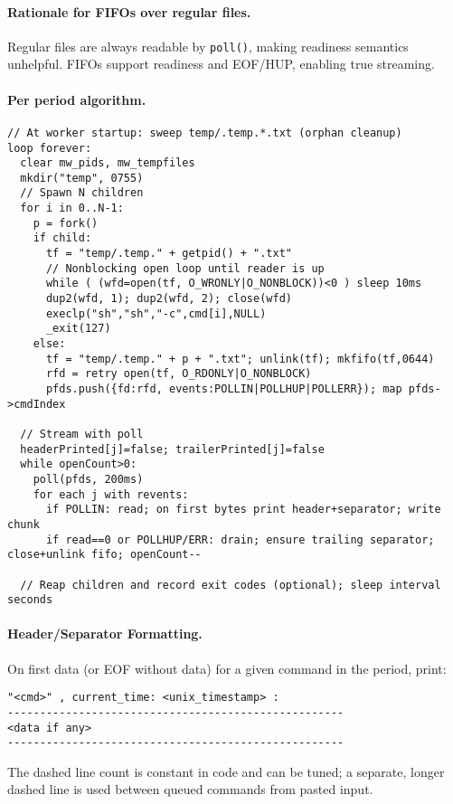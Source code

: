 \documentclass[11pt,a4paper]{article}
\begin{document}
\paragraph{Rationale for FIFOs over regular files.} Regular files are always readable by \texttt{poll()}, making readiness semantics unhelpful. FIFOs support readiness and EOF/HUP, enabling true streaming.

\paragraph{Per period algorithm.}
\begin{lstlisting}[style=code]
// At worker startup: sweep temp/.temp.*.txt (orphan cleanup)
loop forever:
  clear mw_pids, mw_tempfiles
  mkdir("temp", 0755)
  // Spawn N children
  for i in 0..N-1:
    p = fork()
    if child:
      tf = "temp/.temp." + getpid() + ".txt"
      // Nonblocking open loop until reader is up
      while ( (wfd=open(tf, O_WRONLY|O_NONBLOCK))<0 ) sleep 10ms
      dup2(wfd, 1); dup2(wfd, 2); close(wfd)
      execlp("sh","sh","-c",cmd[i],NULL)
      _exit(127)
    else:
      tf = "temp/.temp." + p + ".txt"; unlink(tf); mkfifo(tf,0644)
      rfd = retry open(tf, O_RDONLY|O_NONBLOCK)
      pfds.push({fd:rfd, events:POLLIN|POLLHUP|POLLERR}); map pfds->cmdIndex

  // Stream with poll
  headerPrinted[j]=false; trailerPrinted[j]=false
  while openCount>0:
    poll(pfds, 200ms)
    for each j with revents:
      if POLLIN: read; on first bytes print header+separator; write chunk
      if read==0 or POLLHUP/ERR: drain; ensure trailing separator; close+unlink fifo; openCount--

  // Reap children and record exit codes (optional); sleep interval seconds
\end{lstlisting}

\paragraph{Header/Separator Formatting.}
On first data (or EOF without data) for a given command in the period, print:
\begin{lstlisting}[style=code]
"<cmd>" , current_time: <unix_timestamp> :
----------------------------------------------------
<data if any>
----------------------------------------------------
\end{lstlisting}
The dashed line count is constant in code and can be tuned; a separate, longer dashed line is used between queued commands from pasted input.
\end{document}
